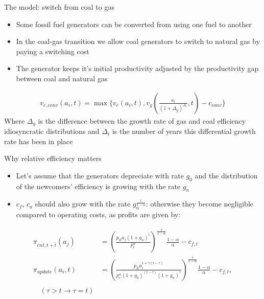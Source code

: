 \documentclass{beamer}
\begin{document}
\begin{frame}{The model: switch from coal to gas}\label{coal_gas}
\begin{itemize}
    \item Some fossil fuel generators can be converted from using one fuel to another
    \item In the coal-gas transition we allow coal generators to switch to natural gas by paying a switching cost
    \item The generator keeps it's initial productivity adjusted by the productivity gap between coal and natural gas
\end{itemize}
\begin{align*}
    v_{c,conv}(a_i,t) = \max \big\{ v_c(a_i,t), v_g(\frac{a_i}{(1+\Delta_g)^{\Delta_t}},t)-c_{conv}\big\}
\end{align*}
Where $\Delta_g$ is the difference between the growth rate of gas and coal efficiency idiosyncratic distributions and $\Delta_t$ is the number of years this differential growth rate has been in place
\hyperlink{gen_problem}{}    
\hyperlink{value_fn}{}    

\end{frame}
\begin{frame}{Why relative efficiency matters}\label{rel_eff_why}
\small\begin{itemize}
    \item Let's assume that the generators depreciate with rate $g_0$ and the distribution of the newcomers' efficiency is growing with the rate $g_n$
    \item $c_f$, $c_a$ should also grow with the rate $g_n^\frac{1}{1-\alpha}$: otherwise they become negligible compared to operating costs, as profits are given by:\\
\end{itemize}
\begin{align*}
        \pi_{ent,t+\hat{t}}(a_j) &= \left(\frac{p_E a_j\left(1+g_n\right)^\hat{t}}{p_e^\alpha}\right)^{\frac{1}{1-\alpha}} \frac{1-\alpha}{\alpha} - c_{f,t}\\
        \pi_{update}(a_i,t) &= \left(\frac{p_E a_i^{1+\gamma (t-\tau)}}{p_e^\alpha\left(1+g_0\right)^{(t-\tau)}\left(1+g_n\right)^\tau}\right)^{\frac{1}{1-\alpha}} \frac{1-\alpha}{\alpha}-c_{f,t}, \\\\ \quad (\tau>t \rightarrow \tau = t)
    \end{align*}
\end{frame}
\end{document}
